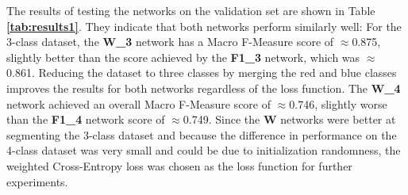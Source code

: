 \noindent The results of testing the networks on the validation set are shown in Table \textbf{\ref{tab:results1}}. They indicate that both networks perform similarly well: For the 3-class dataset, the \textbf{W\_3} network has a Macro F-Measure score of $\approx$0.875, slightly better than the score achieved by the \textbf{F1\_3} network, which was $\approx$0.861. Reducing the dataset to three classes by merging the red and blue classes improves the results for both networks regardless of the loss function. The \textbf{W\_4} network achieved an overall Macro F-Measure score of $\approx$0.746, slightly worse than the \textbf{F1\_4} network score of $\approx$0.749. Since the \textbf{W} networks were better at segmenting the 3-class dataset and because the difference in performance on the 4-class dataset was very small and could be due to initialization randomness, the weighted Cross-Entropy loss was chosen as the loss function for further experiments.\\


